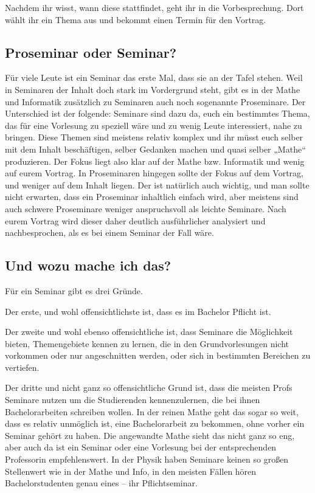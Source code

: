 Nachdem ihr wisst, wann diese stattfindet, geht ihr in die Vorbesprechung. Dort wählt ihr ein Thema aus und bekommt einen Termin für den Vortrag.

\subsection{Proseminar oder Seminar?}
Für viele Leute ist ein Seminar das erste Mal, dass sie an der Tafel stehen.  Weil in Seminaren der Inhalt doch stark im Vordergrund steht, gibt es in der Mathe und Informatik zusätzlich zu Seminaren auch noch sogenannte Proseminare. Der Unterschied ist der folgende: Seminare sind dazu da, euch ein bestimmtes Thema, das für eine Vorlesung zu speziell wäre und zu wenig Leute interessiert, nahe zu bringen. Diese Themen sind meistens relativ komplex und ihr müsst euch selber mit dem Inhalt beschäftigen, selber Gedanken machen und quasi selber „Mathe“ produzieren. Der Fokus liegt also klar auf der Mathe bzw. Informatik und wenig auf eurem Vortrag. In Proseminaren hingegen sollte der Fokus auf dem Vortrag, und weniger auf dem Inhalt liegen. Der ist natürlich auch wichtig, und man sollte nicht erwarten, dass ein Proseminar inhaltlich einfach wird, aber meistens sind auch schwere Proseminare weniger anspruchsvoll als leichte Seminare. Nach eurem Vortrag wird dieser daher deutlich ausführlicher analysiert und nachbesprochen, als es bei einem Seminar der Fall wäre.

\subsection{Und wozu mache ich das?}
Für ein Seminar gibt es drei Gründe.

Der erste, und wohl offensichtlichste ist, dass es im Bachelor Pflicht ist.

Der zweite und wohl ebenso offensichtliche ist, dass Seminare die Möglichkeit bieten, Themengebiete kennen zu lernen, die in den Grundvorlesungen nicht vorkommen oder nur angeschnitten werden, oder sich in bestimmten Bereichen zu vertiefen.

Der dritte und nicht ganz so offensichtliche Grund ist, dass die meisten Profs Seminare nutzen um die Studierenden kennenzulernen, die bei ihnen Bachelorarbeiten schreiben wollen. In der reinen Mathe geht das sogar so weit, dass es relativ unmöglich ist, eine Bachelorarbeit zu bekommen, ohne vorher ein Seminar gehört zu haben. Die angewandte Mathe sieht das nicht ganz so eng, aber auch da ist ein Seminar oder eine Vorlesung bei der entsprechenden Professorin empfehlenswert. In der Physik haben Seminare keinen so großen Stellenwert wie in der Mathe und Info, in den meisten Fällen hören Bachelorstudenten genau eines -- ihr Pflichtseminar. 
